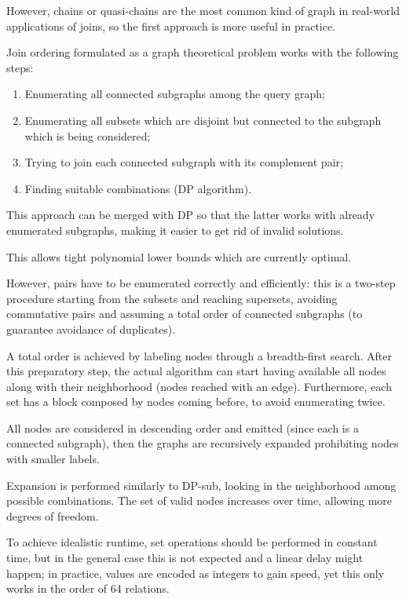 However, chains or quasi-chains are the most common kind of graph in real-world applications of joins, so the first approach is more useful in practice.

Join ordering formulated as a graph theoretical problem works with the following steps:

\begin{enumerate}
	\item Enumerating all connected subgraphs among the query graph;
	\item Enumerating all subsets which are disjoint but connected to the subgraph which is being considered;
	\item Trying to join each connected subgraph with its complement pair;
	\item Finding suitable combinations (DP algorithm).
\end{enumerate}

This approach can be merged with DP so that the latter works with already enumerated subgraphs, making it easier to get rid of invalid solutions.

This allows tight polynomial lower bounds which are currently optimal. 

However, pairs have to be enumerated correctly and efficiently: this is a two-step procedure starting from the subsets and reaching supersets, avoiding commutative pairs and assuming a total order of connected subgraphs (to guarantee avoidance of duplicates).

A total order is achieved by labeling nodes through a breadth-first search. After this preparatory step, the actual algorithm can start having available all nodes along with their neighborhood (nodes reached with an edge). Furthermore, each set has a block composed by nodes coming before, to avoid enumerating twice.

All nodes are considered in descending order and emitted (since each is a connected subgraph), then the graphs are recursively expanded prohibiting nodes with smaller labels. 

Expansion is performed similarly to DP-sub, looking in the neighborhood among possible combinations. The set of valid nodes increases over time, allowing more degrees of freedom.

To achieve idealistic runtime, set operations should be performed in constant time, but in the general case this is not expected and a linear delay might happen; in practice, values are encoded as integers to gain speed, yet this only works in the order of 64 relations.

